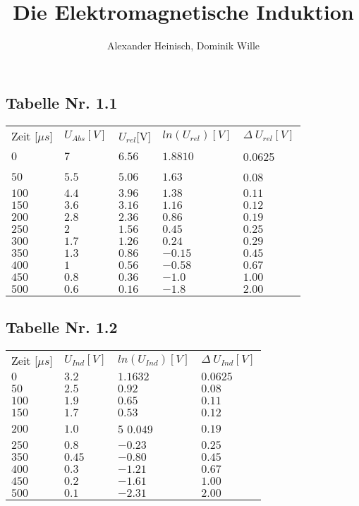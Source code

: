 \documentclass{article}
\title{Die Elektromagnetische Induktion}
\author{Alexander Heinisch, Dominik Wille}
\begin{document}
\subsection*{Tabelle Nr. 1.1}
\begin{tabular}{l l l l l}
Zeit [\(\mu s\)] & \(U_{Abs}[V]\) & \(U_{rel}\)[V] & \(ln(U_{rel})[V]\) & \(\Delta\ U_{rel}[V]\) \\
\(0\) & \(7\)	& \(6.56\) &	\(1.8810\) & 0.0625\\
\(50\) & \(5.5\) &	\(5.06\) &	\(1.63\) &  0.08 \\
\(100\) &	\(4.4\) &	\(3.96\) &	\(1.38\) &  \(0.11\)\\
\(150\) &	\(3.6\) &	\(3.16\) &	\(1.16\) & \(0.12\)\\
\(200\) &	\(2.8\) &	\(2.36\) &	\(0.86\) & \(0.19\)\\
\(250\) &	\(2\) &	\(1.56\) &	\(0.45\) & \(0.25\) \\
\(300\) &	\(1.7\) &	\(1.26\) &	\(0.24\) & \(0.29\) \\
\(350\) &	\(1.3\) &	\(0.86\) &	\(-0.15\) & \(0.45\) \\
\(400\) &	\(1\) &	\(0.56\) &	\(-0.58\) & \(0.67\) \\
\(450\) &	\(0.8\) &	\(0.36\) &	\(-1.0\) & \(1.00\) \\
\(500\) &	\(0.6\) &	\(0.16\) &	\(-1.8\) & \(2.00\) \\
\end{tabular}

\subsection*{Tabelle Nr. 1.2}
\begin{tabular}{l l l l}
Zeit [\(\mu s\)] & \(U_{Ind}[V]\) & \(ln(U_{Ind})[V]\) & \(\Delta\ U_{Ind}[V]\) \\
\(0\) &	\(3.2\) &	\(1.1632\) &	\(0.0625\)\\
\(50\) &	\(2.5\) &	\(0.92\) &	\(0.08\)\\
\(100\) &	\(1.9\) &	\(0.65\) &	\(0.11\)\\
\(150\) &	\(1.7\) &	\(0.53\) &	\(0.12\)\\
\(200\) &	\(1.0\) &5	\(0.049\) &	\(0.19\)\\
\(250\) &	\(0.8\) &	\(-0.23\) &	\(0.25\)\\
\(350\) &	\(0.45\) &	\(-0.80\) &	\(0.45\)\\
\(400\) &	\(0.3\) &	\(-1.21\) &	\(0.67\)\\
\(450\) &	\(0.2\) &	\(-1.61\) &	\(1.00\)\\
\(500\) &	\(0.1\) &	\(-2.31\) &	\(2.00\)\\

\end{tabular}
\end{document}
